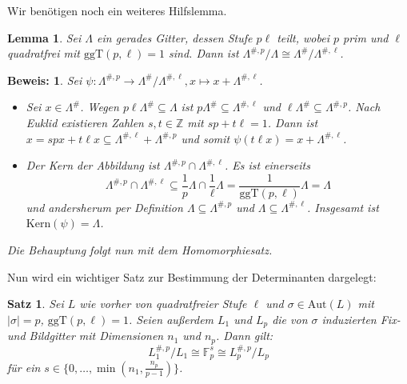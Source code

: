 \documentclass[12pt,a4paper,halfparskip,headsepline,bibtotocnumbered]{scrreprt}
\theoremstyle{nummermitklammern}
\newtheorem{satz}[defsatzusw]{Satz}
\newtheorem{lemma}[defsatzusw]{Lemma}
\theoremstyle{nonumberbreak}
\newtheorem{beweis}{Beweis:}
\newcommand{\Z}{\mathbb{Z}}
\newcommand{\F}{\mathbb{F}}
\newcommand{\Kern}{\text{Kern}}
\newcommand{\ggT}{\text{ggT}}
\newcommand{\Aut}{\text{Aut}}
\begin{document}
Wir benötigen noch ein weiteres Hilfslemma.

\begin{framed}
	\begin{lemma}\label{lem:quotiso}
		Sei $\Lambda$ ein gerades Gitter, dessen Stufe $p \ell$ teilt, wobei $p$ prim und $\ell$ quadratfrei mit $\ggT(p, \ell) = 1$ sind. Dann ist $\Lambda^{\#,p} / \Lambda \cong \Lambda^\# / \Lambda^{\#,\ell}$.
	\end{lemma}
\end{framed}

\begin{beweis}
	Sei $\psi:\Lambda^{\#,p} \rightarrow \Lambda^\# / \Lambda^{\#, \ell}, x \mapsto x + \Lambda^{\#, \ell}$.
	\begin{itemize}[align=left, leftmargin = *]
		\item[Surjektivität:] Sei $x \in \Lambda^\#$. Wegen $p \ell \Lambda^\# \subseteq \Lambda$ ist $p \Lambda^\# \subseteq \Lambda^{\#, \ell}$ und $\ell \Lambda^\# \subseteq \Lambda^{\#, p}$. Nach Euklid existieren Zahlen $s, t \in \Z$ mit $s p + t \ell = 1$. Dann ist $x = s p x + t \ell x \subseteq \Lambda^{\#, \ell} + \Lambda^{\#, p}$ und somit $\psi(t \ell x) = x + \Lambda^{\#, \ell}$.
		\item[Kern:] Der Kern der Abbildung ist $\Lambda^{\#, p} \cap \Lambda^{\#, \ell}$. Es ist einerseits
		\begin{equation*}
			\Lambda^{\#, p} \cap \Lambda^{\#, \ell} \subseteq \frac{1}{p} \Lambda \cap \frac{1}{\ell} \Lambda = \frac{1}{\ggT(p, \ell)}\Lambda = \Lambda
		\end{equation*}
		und andersherum per Definition $\Lambda \subseteq \Lambda^{\#,p}$ und $\Lambda \subseteq \Lambda^{\#, \ell}$. Insgesamt ist\linebreak
		$\Kern(\psi) = \Lambda$.
	\end{itemize}
	Die Behauptung folgt nun mit dem Homomorphiesatz.
\end{beweis}

Nun wird ein wichtiger Satz zur Bestimmung der Determinanten dargelegt:

\begin{framed}
	\begin{satz} \label{th:fps}
		Sei $L$ wie vorher von quadratfreier Stufe $\ell$ und $\sigma \in \Aut(L)$ mit $\vert \sigma \vert = p$, $\ggT(p,\ell) = 1$. Seien außerdem $L_1$ und $L_p$ die von $\sigma$ induzierten Fix- und Bildgitter mit Dimensionen $n_1$ und $n_p$. Dann gilt:
		\begin{equation*}
			L_1^{\#,p} / L_1 \cong \F_p^s \cong L_p^{\#,p} / L_p
		\end{equation*}
		für ein $s \in \lbrace 0, \dots, \min(n_1, \frac{n_p}{p-1})\rbrace$.
	\end{satz}
\end{framed}
\end{document}

